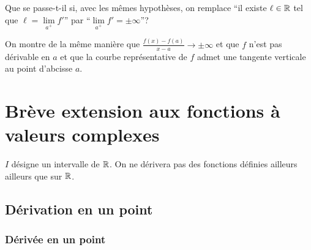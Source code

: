 Que se passe-t-il si, avec les mêmes hypothèses, on remplace ``il existe $\ell \in \mathbb{R}$ tel que $\ell=\lim\limits_{a^+}f'$'' par ``$\lim\limits_{a^+} f'=\pm \infty$''?

On montre de la même manière que $\frac{f(x)-f(a)}{x-a} \to \pm \infty$ et que $f$ n'est pas dérivable en $a$ et que la courbe représentative de $f$ admet une tangente verticale au point d'abcisse $a$.

\section{Brève extension aux fonctions à valeurs complexes}

$I$ désigne un intervalle de $\mathbb{R}$. On ne dérivera pas des fonctions définies ailleurs ailleurs que sur $\mathbb{R}$.

\subsection{Dérivation en un point}

\subsubsection{Dérivée en un point}

